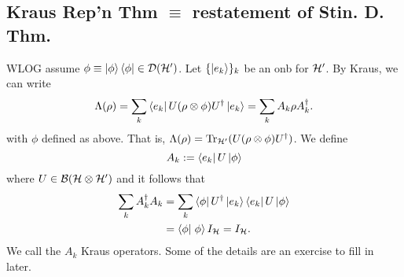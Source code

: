 \subsection*{Kraus Rep'n Thm $\equiv$ restatement of Stin. D. Thm.}
WLOG assume $\phi\equiv \left| \phi \right>\left< \phi \right| \in \mathcal{D}(\mathcal H')$. Let $\{\left| e_k \right>\}_k$ be an onb for $\mathcal H'$. By Kraus, we can write
\begin{equation}
    \Lambda(\rho)=\sum_k \left< e_k \right|U(\rho\otimes \phi) U^\dagger \left| e_k \right>=\sum_k A_k \rho A_k^\dagger.
\end{equation}
with $\phi$ defined as above. That is, $\Lambda(\rho)=\operatorname{Tr}_{\mathcal H'}(U(\rho \otimes \phi)U^\dagger)$. We define
\begin{equation}
    A_k:= \left< e_k \right|U \left| \phi \right>
\end{equation}
where $U\in \mathcal{B}(\mathcal H \otimes \mathcal H')$ and it follows that
\begin{align*}
    \sum_k A_k^\dagger A_k &= \sum_k \bra{\phi}U^\dagger \kb{e_k}{e_k} U \ket{\phi}\\
    &= \braket{\phi}{\phi}I_{\cH} = I_{\cH}.
\end{align*}
We call the $A_k$ Kraus operators. Some of the details are an exercise to fill in later.

